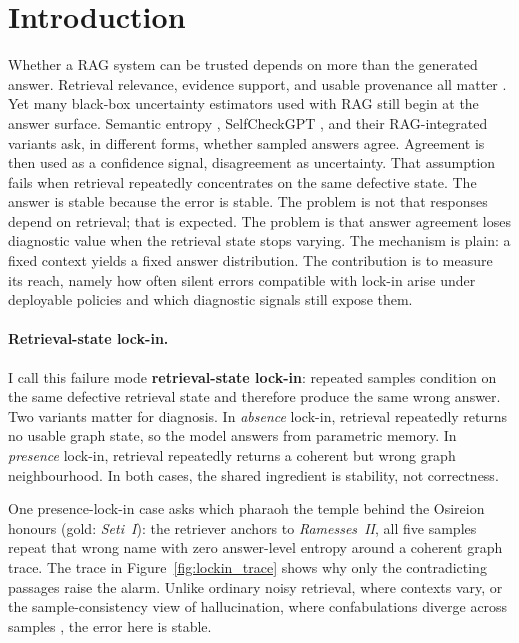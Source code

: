\section{Introduction}
\label{sec:introduction}

Whether a RAG system can be trusted depends on more than the generated answer.
Retrieval relevance, evidence support, and usable provenance all matter
\citep{sun2024trustllm,ni2025trustworthyrag}.
Yet many black-box uncertainty estimators used with RAG still begin at the
answer surface.
Semantic entropy \citep{farquhar2024detecting,kuhn2023semantic},
SelfCheckGPT \citep{manakul2023selfcheckgpt}, and their RAG-integrated
variants \citep{jiang2023active,su2024dragin,zimmerman2024twotieredrag} ask,
in different forms, whether sampled answers agree.
Agreement is then used as a confidence signal, disagreement as uncertainty.
That assumption fails when retrieval repeatedly concentrates on the same
defective state. The answer is stable because the error is stable.
The problem is not that responses depend on retrieval; that is expected.
The problem is that answer agreement loses diagnostic value when the retrieval
state stops varying.
The mechanism is plain: a fixed context yields a fixed answer distribution.
The contribution is to measure its reach, namely how often silent errors
compatible with lock-in arise under deployable policies and which diagnostic
signals still expose them.

\paragraph{Retrieval-state lock-in.}
I call this failure mode \textbf{retrieval-state lock-in}: repeated samples
condition on the same defective retrieval state and therefore produce the
same wrong answer.
Two variants matter for diagnosis.
In \emph{absence} lock-in, retrieval repeatedly returns no usable graph
state, so the model answers from parametric memory.
In \emph{presence} lock-in, retrieval repeatedly returns a coherent but
wrong graph neighbourhood.
In both cases, the shared ingredient is stability, not correctness.

One presence-lock-in case asks which pharaoh the temple behind the Osireion
honours (gold: \emph{Seti~I}): the retriever anchors to \emph{Ramesses~II},
all five samples repeat that wrong name with zero answer-level entropy around a
coherent graph trace. The trace in Figure~\ref{fig:lockin_trace} shows why only
the contradicting passages raise the alarm.
Unlike ordinary noisy retrieval, where contexts vary, or the sample-consistency
view of hallucination, where confabulations diverge across samples
\citep{manakul2023selfcheckgpt,farquhar2024detecting}, the error here is stable.

